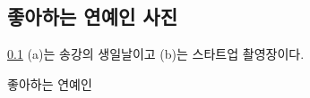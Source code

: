 \documentclass{article}
\begin{document}
\begin{figure}[h!]
\subsection{좋아하는 연예인 사진}
\label{sec2:subsec2}
\begin{center}
    \caption{좋아하는 연예인}
    \label{fig:fig2}
    \ref{sec2:subsec2} (a)는 송강의 생일날이고 (b)는 스타트업 촬영장이다.
\end{center}
\end{figure}
\end{document}
